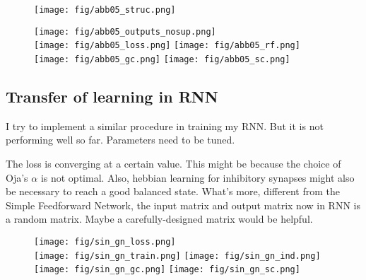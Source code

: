 \documentclass[12pt, a4paper]{article}
\begin{document}
\begin{figure}[H]
    \centering
    \texttt{[image: fig/abb05\_struc.png]}
    \label{fig:1}
\end{figure}

\begin{figure}[H]
    \centering
    \texttt{[image: fig/abb05\_outputs\_nosup.png]} \\
    \texttt{[image: fig/abb05\_loss.png]}
    \texttt{[image: fig/abb05\_rf.png]}
    \texttt{[image: fig/abb05\_gc.png]}
    \texttt{[image: fig/abb05\_sc.png]}
    \label{fig:1}
\end{figure}

\newpage

\subsection*{Transfer of learning in RNN}

I try to implement a similar procedure in training my RNN. But it is not performing well so far. Parameters need to be tuned.

The loss is converging at a certain value. This might be because the choice of Oja's $\alpha$ is not optimal. Also, hebbian learning for inhibitory synapses might also be necessary to reach a good balanced state. What's more, different from the Simple Feedforward Network, the input matrix and output matrix now in RNN is a random matrix. Maybe a carefully-designed matrix would be helpful.

\begin{figure}[H]
    \centering
    \texttt{[image: fig/sin\_gn\_loss.png]} \\
    \texttt{[image: fig/sin\_gn\_train.png]}
    \texttt{[image: fig/sin\_gn\_ind.png]}
    \texttt{[image: fig/sin\_gn\_gc.png]}
    \texttt{[image: fig/sin\_gn\_sc.png]}
    \label{fig:1}
\end{figure}

\newpage
\end{document}
